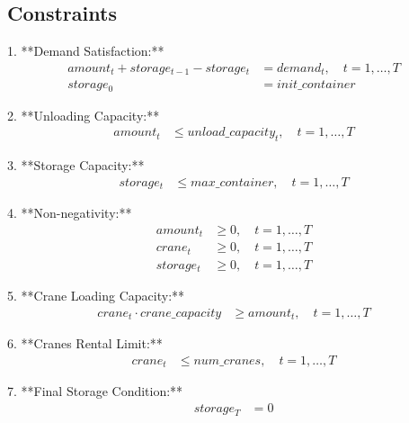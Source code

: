 \documentclass{article}
\begin{document}
\subsection*{Constraints}
1. **Demand Satisfaction:**
\begin{align*}
amount_t + storage_{t-1} - storage_t & = demand_t, \quad t = 1, \ldots, T \\
storage_0 & = init\_container
\end{align*}

2. **Unloading Capacity:**
\begin{align*}
amount_t & \leq unload\_capacity_t, \quad t = 1, \ldots, T
\end{align*}

3. **Storage Capacity:**
\begin{align*}
storage_t & \leq max\_container, \quad t = 1, \ldots, T
\end{align*}

4. **Non-negativity:**
\begin{align*}
amount_t & \geq 0, \quad t = 1, \ldots, T \\
crane_t & \geq 0, \quad t = 1, \ldots, T \\
storage_t & \geq 0, \quad t = 1, \ldots, T
\end{align*}

5. **Crane Loading Capacity:**
\begin{align*}
crane_t \cdot crane\_capacity & \geq amount_t, \quad t = 1, \ldots, T
\end{align*}

6. **Cranes Rental Limit:**
\begin{align*}
crane_t & \leq num\_cranes, \quad t = 1, \ldots, T
\end{align*}

7. **Final Storage Condition:**
\begin{align*}
storage_T & = 0
\end{align*}
\end{document}
